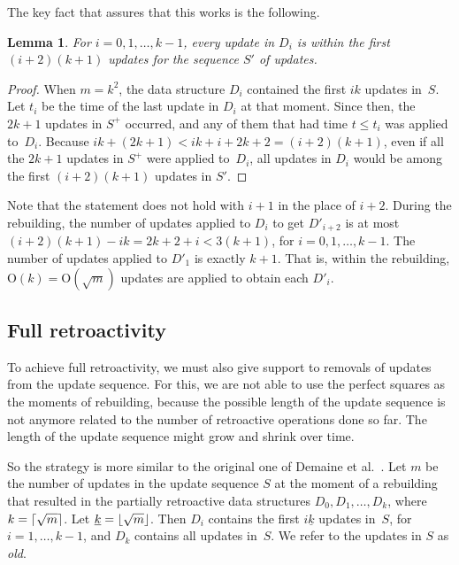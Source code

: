 \documentclass[reqno,11pt]{amsart}
\DeclarePairedDelimiter\ceil{\lceil}{\rceil}
\DeclarePairedDelimiter\floor{\lfloor}{\rfloor}
\newtheorem{lemma}     	[theorem] {Lemma}
\newcommand{\Oh}{\mathrm{O}}
\begin{document}
\medskip 

The key fact that assures that this works is the following. 

\begin{lemma}
  For $i=0,1,\ldots,k-1$, every update in $D_i$ is within 
  the first $(i+2)(k+1)$ updates for the sequence $S'$ of updates. 
\end{lemma}

\begin{proof}
  When $m=k^2$, the data structure $D_i$ contained the first $ik$ updates in~$S$. 
  Let $t_i$ be the time of the last update in $D_i$ at that moment.
  Since then, the $2k+1$ updates in $S^+$ occurred, 
  and any of them that had time $t \leq t_i$ was applied to~$D_i$. 
  Because $ik+(2k+1) < ik+i+2k+2 = (i+2)(k+1)$, 
  even if all the $2k+1$ updates in $S^+$ were applied to~$D_i$,
  all updates in $D_i$ would be among the first $(i+2)(k+1)$ updates in $S'$. 
\end{proof}

Note that the statement does not hold with $i+1$ in the place of $i+2$. 
During the rebuilding, the number of updates applied to $D_i$ to get $D'_{i+2}$ 
is at most $(i+2)(k+1)-ik = 2k+2+i < 3(k+1)$, for $i=0,1,\ldots,k-1$.  
The number of updates applied to $D'_1$ is exactly $k+1$.  That is, within the 
rebuilding, $\Oh(k) = \Oh(\sqrt{m})$ updates are applied to obtain each $D'_i$.

\subsection{Full retroactivity}\label{subsec:fully}

To achieve full retroactivity, 
we must also give support to removals of updates from the update sequence.  
For this, we are not able to use the perfect squares as the moments 
of rebuilding, because the possible length of the update sequence is
not anymore related to the number of retroactive operations done so far. 
The length of the update sequence might grow and shrink over time. 

So the strategy is more similar to the original one of Demaine et al.~\cite{DemaineIL2007}. 
Let $m$ be the number of updates in the update sequence $S$ at the
moment of a rebuilding that resulted in the partially retroactive 
data structures $D_0,D_1,\ldots,D_k$, where $k=\ceil{\sqrt{m}}$.
Let $\underline{k} = \floor{\sqrt{m}}$.
Then $D_i$ contains the first $i\underline{k}$ updates in~$S$, 
for $i=1,\ldots,k-1$, and $D_k$ contains all updates in~$S$. 
We refer to the updates in $S$ as \emph{old}.
\end{document}
